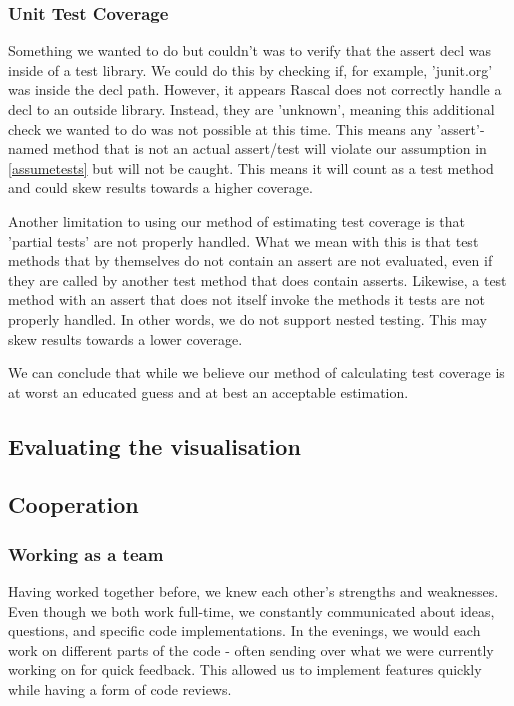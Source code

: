 \documentclass{article}
\begin{document}
\subsubsection{Unit Test Coverage}
Something we wanted to do but couldn't was to verify that the assert decl was inside of a test library. We could do this by checking if, for example, 'junit.org' was inside the decl path. However, it appears Rascal does not correctly handle a decl to an outside library. Instead, they are 'unknown', meaning this additional check we wanted to do was not possible at this time. This means any 'assert'-named method that is not an actual assert/test will violate our assumption in \ref{assumetests} but will not be caught. This means it will count as a test method and could skew results towards a higher coverage.

Another limitation to using our method of estimating test coverage is that 'partial tests' are not properly handled. What we mean with this is that test methods that by themselves do not contain an assert are not evaluated, even if they are called by another test method that does contain asserts. Likewise, a test method with an assert that does not itself invoke the methods it tests are not properly handled.
In other words, we do not support nested testing. This may skew results towards a lower coverage.

We can conclude that while we believe our method of calculating test coverage is at worst an educated guess and at best an acceptable estimation.

\subsection{Evaluating the visualisation}

\subsection{Cooperation}
\subsubsection{Working as a team}
Having worked together before, we knew each other's strengths and weaknesses. Even though we both work full-time, we constantly communicated about ideas, questions, and specific code implementations. 
In the evenings, we would each work on different parts of the code - often sending over what we were currently working on for quick feedback. This allowed us to implement features quickly while having a form of code reviews.
\end{document}
